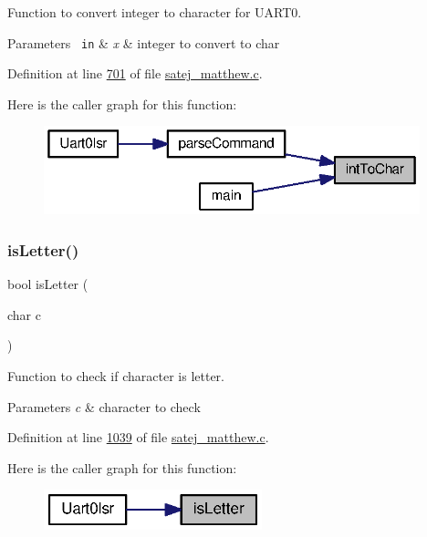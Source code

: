 Function to convert integer to character for U\+A\+R\+T0. 


\begin{DoxyParams}[1]{Parameters}
\mbox{\texttt{ in}}  & {\em x} & integer to convert to char \\
\hline
\end{DoxyParams}


Definition at line \mbox{\hyperlink{satej__matthew_8c_source_l00701}{701}} of file \mbox{\hyperlink{satej__matthew_8c_source}{satej\+\_\+matthew.\+c}}.

Here is the caller graph for this function\+:\nopagebreak
\begin{figure}[H]
\begin{center}
\leavevmode
\includegraphics[width=309pt]{satej__matthew_8c_a48ff33038777eac27bf41ff14b9368bf_icgraph}
\end{center}
\end{figure}
\mbox{\label{satej__matthew_8c_a19ec769227acc123bfe1e2d225a211cb}} 
\subsubsection{\texorpdfstring{isLetter()}{isLetter()}}
{\footnotesize\ttfamily bool is\+Letter (\begin{DoxyParamCaption}\item[{char}]{c }\end{DoxyParamCaption})}



Function to check if character is letter. 


\begin{DoxyParams}{Parameters}
{\em c} & character to check \\
\hline
\end{DoxyParams}


Definition at line \mbox{\hyperlink{satej__matthew_8c_source_l01039}{1039}} of file \mbox{\hyperlink{satej__matthew_8c_source}{satej\+\_\+matthew.\+c}}.

Here is the caller graph for this function\+:\nopagebreak
\begin{figure}[H]
\begin{center}
\leavevmode
\includegraphics[width=179pt]{satej__matthew_8c_a19ec769227acc123bfe1e2d225a211cb_icgraph}
\end{center}
\end{figure}
\mbox{\label{satej__matthew_8c_a65b1640156c68ea7687a41428022c1d8}} 
